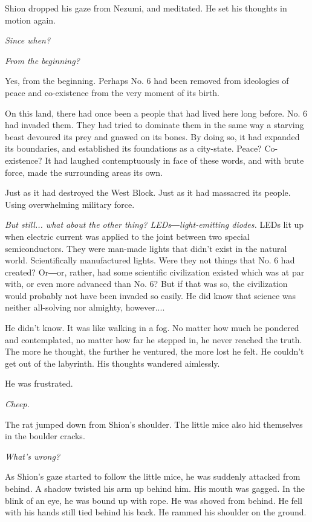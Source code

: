Shion dropped his gaze from Nezumi, and meditated. He set his thoughts
in motion again.

\emph{Since when?}

\emph{From the beginning?}

Yes, from the beginning. Perhaps No. 6 had been removed from ideologies
of peace and co-existence from the very moment of its birth.

On this land, there had once been a people that had lived here long
before. No. 6 had invaded them. They had tried to dominate them in the
same way a starving beast devoured its prey and gnawed on its bones. By
doing so, it had expanded its boundaries, and established its
foundations as a city-state. Peace? Co-existence? It had laughed
contemptuously in face of these words, and with brute force, made the
surrounding areas its own.

Just as it had destroyed the West Block. Just as it had massacred its
people. Using overwhelming military force.

\emph{But still... what about the other thing? LEDs―light-emitting diodes.}
LEDs lit up when electric current was applied to the joint between two
special semiconductors. They were man-made lights that didn't exist in
the natural world. Scientifically manufactured lights. Were they not
things that No. 6 had created? Or―or, rather, had some scientific
civilization existed which was at par with, or even more advanced than
No. 6? But if that was so, the civilization would probably not have been
invaded so easily. He did know that science was neither all-solving nor
almighty, however....

He didn't know. It was like walking in a fog. No matter how much he
pondered and contemplated, no matter how far he stepped in, he never
reached the truth. The more he thought, the further he ventured, the
more lost he felt. He couldn't get out of the labyrinth. His thoughts
wandered aimlessly.

He was frustrated.

\emph{Cheep.}

The rat jumped down from Shion's shoulder. The little mice also hid
themselves in the boulder cracks.

\emph{What's wrong?}

As Shion's gaze started to follow the little mice, he was suddenly
attacked from behind. A shadow twisted his arm up behind him. His mouth
was gagged. In the blink of an eye, he was bound up with rope. He was
shoved from behind. He fell with his hands still tied behind his back.
He rammed his shoulder on the ground.

